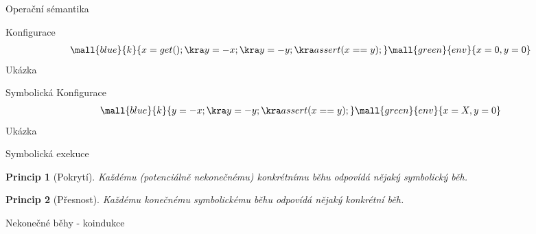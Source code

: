 \documentclass[11pt]{beamer}
\newtheorem{principle}{Princip}
\begin{document}
\begin{frame}{Operační sémantika}
\begin{figure}
\begin{tikzpicture}
%
%
%
%


\end{tikzpicture}
\end{figure}
\end{frame}

\begin{frame}{Konfigurace}
\begin{multline*}
\mall{blue}{k}{x=get(); \kra y=-x; \kra y=-y; \kra assert(x == y);} \mall{green}{env}{x=0,y=0}
\end{multline*}
\pause
Ukázka
\end{frame}

\begin{frame}{Symbolická Konfigurace}
\begin{multline*}
\mall{blue}{k}{y=-x; \kra y=-y; \kra assert(x == y);} \mall{green}{env}{x=X,y=0}
\end{multline*}
\pause
Ukázka
\end{frame}

\begin{frame}{Symbolická exekuce}

\begin{principle}[Pokrytí]
Každému (potenciálně nekonečnému) konkrétnímu běhu odpovídá nějaký symbolický běh.
\end{principle}

\pause

\begin{principle}[Přesnost]
Každému konečnému symbolickému běhu odpovídá nějaký konkrétní běh.
\end{principle}

\pause Nekonečné běhy - koindukce

\end{frame}
\end{document}
